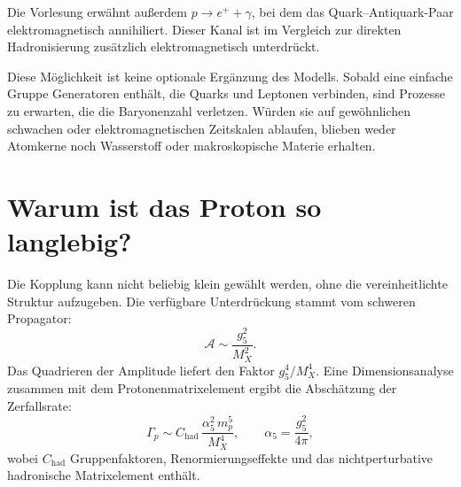 Die Vorlesung erwähnt außerdem \(p\to e^++\gamma\), bei dem das Quark--Antiquark-Paar elektromagnetisch annihiliert. Dieser Kanal ist im Vergleich zur direkten Hadronisierung zusätzlich elektromagnetisch unterdrückt.

Diese Möglichkeit ist keine optionale Ergänzung des Modells. Sobald eine einfache Gruppe Generatoren enthält, die Quarks und Leptonen verbinden, sind Prozesse zu erwarten, die die Baryonenzahl verletzen. Würden sie auf gewöhnlichen schwachen oder elektromagnetischen Zeitskalen ablaufen, blieben weder Atomkerne noch Wasserstoff oder makroskopische Materie erhalten.

\section{Warum ist das Proton so langlebig?}

\begin{classroomqa}
\end{classroomqa}

Die Kopplung kann nicht beliebig klein gewählt werden, ohne die vereinheitlichte Struktur aufzugeben. Die verfügbare Unterdrückung stammt vom schweren Propagator:
\begin{equation}
\mathcal A
\sim
\frac{g_5^2}{M_X^2}.
\label{eq:l10-amplitude}
\end{equation}
Das Quadrieren der Amplitude liefert den Faktor \(g_5^4/M_X^4\). Eine Dimensionsanalyse zusammen mit dem Protonenmatrixelement ergibt die Abschätzung der Zerfallsrate:
\begin{equation}
\Gamma_p
\sim
C_{\mathrm{had}}\,
\frac{\alpha_5^2\,m_p^5}{M_X^4},
\qquad
\alpha_5=\frac{g_5^2}{4\pi},
\label{eq:l10-rate}
\end{equation}
wobei \(C_{\mathrm{had}}\) Gruppenfaktoren, Renormierungseffekte und das nichtperturbative hadronische Matrixelement enthält.


